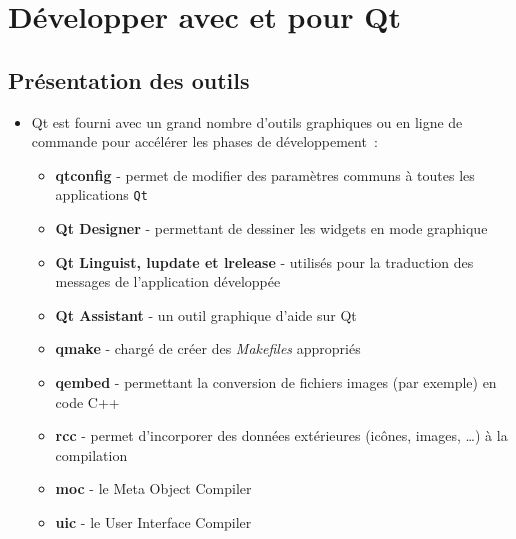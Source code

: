 \documentclass{beamer} %
\begin{document}
\section{Développer avec et pour Qt}
\subsection{Présentation des outils}
\begin{frame}
	\begin{itemize}
	\item<+-> Qt est fourni avec un grand nombre d'outils graphiques ou en ligne de commande pour accélérer les phases de développement~:
		\begin{itemize}
		\item<+-> \textbf{qtconfig} - permet de modifier des paramètres communs à toutes les applications \texttt{Qt}
		\item<+-> \textbf{Qt Designer} - permettant de dessiner les widgets en mode graphique
		\item<+-> \textbf{Qt Linguist, lupdate et lrelease} - utilisés pour la traduction des messages de l'application développée
		\item<+-> \textbf{Qt Assistant} - un outil graphique d'aide sur Qt
		\item<+-> \textbf{qmake} - chargé de créer des \textit{Makefiles} appropriés
		\item<+-> \textbf{qembed} - permettant la conversion de fichiers images (par exemple) en code C++
		\item<+-> \textbf{rcc} - permet d'incorporer des données extérieures (icônes, images, \ldots) à la compilation
		\item<+-> \textbf{moc} - le Meta Object Compiler
		\item<+-> \textbf{uic} - le User Interface Compiler
		\end{itemize}
	\end{itemize}
\end{frame}
\end{document}
